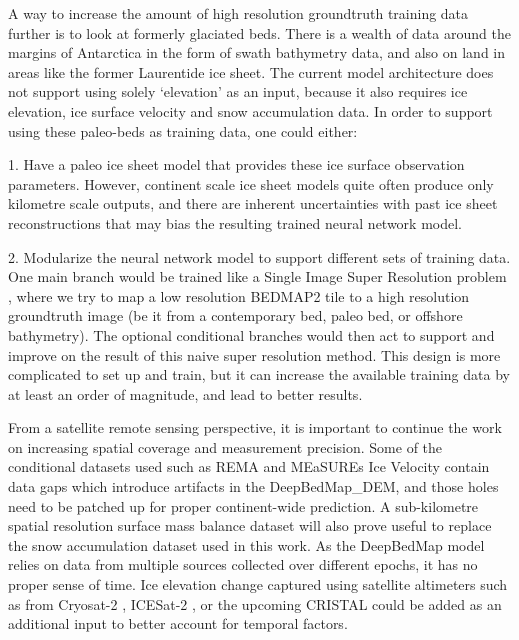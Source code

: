 \documentclass[tc, manuscript]{copernicus}
\begin{document}
A way to increase the amount of high resolution groundtruth training data further is to look at formerly glaciated beds.
There is a wealth of data around the margins of Antarctica in the form of swath bathymetry data, and also on land in areas like the former Laurentide ice sheet.
The current model architecture does not support using solely `elevation' as an input, because it also requires ice elevation, ice surface velocity and snow accumulation data.
In order to support using these paleo-beds as training data, one could either:

1. Have a paleo ice sheet model that provides these ice surface observation parameters.
However, continent scale ice sheet models quite often produce only kilometre scale outputs, and there are inherent uncertainties with past ice sheet reconstructions that may bias the resulting trained neural network model.

2. Modularize the neural network model to support different sets of training data.
One main branch would be trained like a Single Image Super Resolution problem \citep{YangDeepLearningSingle2019}, where we try to map a low resolution BEDMAP2 tile to a high resolution groundtruth image (be it from a contemporary bed, paleo bed, or offshore bathymetry).
The optional conditional branches would then act to support and improve on the result of this naive super resolution method.
This design is more complicated to set up and train, but it can increase the available training data by at least an order of magnitude, and lead to better results.

From a satellite remote sensing perspective, it is important to continue the work on increasing spatial coverage and measurement precision.
Some of the conditional datasets used such as REMA \citep{HowatReferenceElevationModel2019} and MEaSUREs Ice Velocity \citep{MouginotMEaSUREsPhaseMap2019} contain data gaps which introduce artifacts in the DeepBedMap\_DEM, and those holes need to be patched up for proper continent-wide prediction.
A sub-kilometre spatial resolution surface mass balance dataset will also prove useful to replace the snow accumulation dataset \citep{ArthernAntarcticsnowaccumulation2006} used in this work.
As the DeepBedMap model relies on data from multiple sources collected over different epochs, it has no proper sense of time.
Ice elevation change captured using satellite altimeters such as from Cryosat-2 \citep{HelmElevationelevationchange2014}, ICESat-2 \citep{MarkusIceCloudland2017}, or the upcoming CRISTAL \citep{KernCopernicusPolarIce2020} could be added as an additional input to better account for temporal factors.
\end{document}
